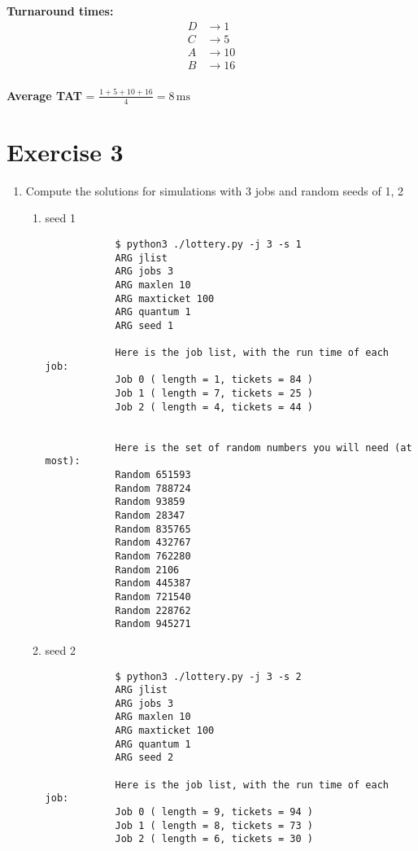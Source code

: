 \documentclass{article}
\newcommand{\exercise}[1]{
    \section*{Exercise #1}
    \markboth{Exercise #1}{}
}
\begin{document}
\vspace{1em}
\noindent
\textbf{Turnaround times:}
\[
\begin{aligned}
    D &\to 1 \\
    C &\to 5 \\
    A &\to 10 \\
    B &\to 16 \\
\end{aligned}
\]

\textbf{Average TAT} = \(\frac{1 + 5 + 10 + 16}{4} = 8\,\text{ms}\)

\newpage

\exercise{3}
\begin{enumerate}[label=\textbf{\arabic*}), start=1]
    \item Compute the solutions for simulations with 3 jobs
    and random seeds of 1, 2
    
    
    \begin{enumerate}[label=\textbf{\arabic*}), start=1]
        \item seed 1
        {\scriptsize

        \begin{verbatim}
            $ python3 ./lottery.py -j 3 -s 1
            ARG jlist 
            ARG jobs 3
            ARG maxlen 10
            ARG maxticket 100
            ARG quantum 1
            ARG seed 1
            
            Here is the job list, with the run time of each job: 
            Job 0 ( length = 1, tickets = 84 )
            Job 1 ( length = 7, tickets = 25 )
            Job 2 ( length = 4, tickets = 44 )
            
            
            Here is the set of random numbers you will need (at most):
            Random 651593
            Random 788724
            Random 93859
            Random 28347
            Random 835765
            Random 432767
            Random 762280
            Random 2106
            Random 445387
            Random 721540
            Random 228762
            Random 945271
        \end{verbatim}
        }
    \item seed 2
    {\scriptsize
    \begin{verbatim}
            $ python3 ./lottery.py -j 3 -s 2
            ARG jlist 
            ARG jobs 3
            ARG maxlen 10
            ARG maxticket 100
            ARG quantum 1
            ARG seed 2

            Here is the job list, with the run time of each job: 
            Job 0 ( length = 9, tickets = 94 )
            Job 1 ( length = 8, tickets = 73 )
            Job 2 ( length = 6, tickets = 30 )



\end{verbatim}}
\end{enumerate}
\end{enumerate}
\end{document}
